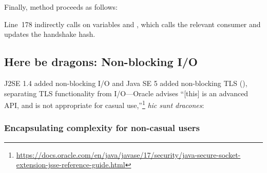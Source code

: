

\noindent
Finally, method  proceeds as follows:



\begin{sloppypar}
\noindent
Line~178 indirectly calls  on variables
 and , which calls the 
relevant consumer and updates the handshake hash.
\end{sloppypar}


\subsection{Here be dragons: Non-blocking I/O}\label{sec:SSLEngine}

J2SE 1.4 added non-blocking I/O and Java SE 5 added non-blocking TLS (), 
separating TLS functionality from I/O---Oracle advises ``[this] is an advanced API, 
and is not appropriate for casual use,''\footnote{\url{https://docs.oracle.com/en/java/javase/17/security/java-secure-socket-extension-jsse-reference-guide.html}} \emph{hic sunt dracones}:


\subsubsection{Encapsulating  complexity for non-casual users}

